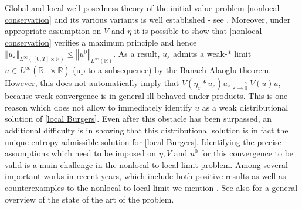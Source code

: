\documentclass[11pt,reqno]{amsart}
\numberwithin{equation}{section}
\begin{document}
Global and local well-posedness theory of the initial value problem \eqref{nonlocal conservation} and its various variants is well established   - see \cite{keimer2023discontinuous,blandin2016well, crippa2013existence, coclite2022existence,colombo2024multidimensional,keimer2017existence,keimer2018existence, coclite2025singular, keimer2019nonlocal}. Moreover, under appropriate assumption on $V$ and $\eta$ it is possible to show that \eqref{nonlocal conservation} verifies a maximum principle and hence $\left\Vert u_{\varepsilon}\right\Vert_{L^{\infty}([0,T]\times \mathbb{R})}\leq \left\Vert u^{0}\right\Vert_{L^{\infty}(\mathbb{R})}$. As a result, $u_{\varepsilon}$ admits a weak-$\ast$ limit  $u\in L^{\infty}(\mathbb{R}_{+}\times \mathbb{R})$ (up to a subsequence) by the Banach-Alaoglu theorem. However, this does not automatically imply that   $V(\eta_{\varepsilon}\ast u_{\varepsilon})u_{\varepsilon}\underset{\varepsilon\rightarrow 0}{\rightharpoonup}V(u)u$, because weak convergence is in general ill-behaved under products. This is one reason which does not allow to immediately identify $u$ as a weak distributional solution of \eqref{local Burgers}. Even after this obstacle has been surpassed, an additional difficulty is in showing that this distributional solution is in fact the unique entropy admissible solution for \eqref{local Burgers}. Identifying  the precise assumptions which need to be imposed on $\eta,V$ and $u^{0}$ for this convergence to be valid is a main challenge in the nonlocal-to-local limit problem. 
Among several important works in recent years, which include both positive results as well as counterexamples to the nonlocal-to-local limit we mention \cite{colombo2019singular, colombo2021local,coclite2024oleinik, friedrich2024conservation, coclite2025singular,de2026volterra, coclite2022general}. See also \cite{colombo2023overview} for a general overview of the state of the art of the problem. 
\end{document}
